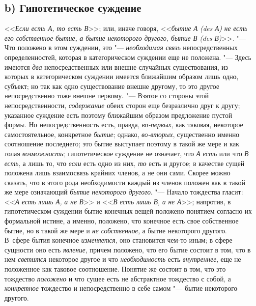 {\subsection[b) Гипотетическое суждение]{b) Гипотетическое суждение}
<<{\em Если есть А, то есть В}>>;
или, иначе говоря,
<<{\em бытие А (des А) не есть его
собственное бытие, а бытие некоторого другого, бытие В (des В)}>>. "---
Что положено в этом суждении, это
"--- {\em необходимая связь}
непосредственных определенностей, которая в категорическом
суждении еще не положена. "--- Здесь имеются
{\em два}
непосредственных или внешне-случайных существования, из
которых в категорическом суждении имеется ближайшим образом лишь одно,
субъект; но так как одно существование внешне другому, то это другое
непосредственно тоже внешне первому. "--- Взятое со стороны
этой непосредственности,
{\em содержание} обеих
сторон еще безразлично друг к другу; указанное суждение есть поэтому
ближайшим образом предложение пустой формы. Но непосредственность есть,
правда, {\em во-первых},
как таковая, некоторое самостоятельное, конкретное
{\em бытие}; однако,
{\em во-вторых},
существенно именно соотношение последнего; это бытие
выступает поэтому в такой же мере и как голая
{\em возможность};
гипотетическое суждение не означает, что
{\em А есть} или что
{\em В есть}, а лишь то,
что {\em если} есть одно
из них, {\em то} есть и
другое; в качестве сущей положена лишь взаимосвязь крайних членов, а не они
сами. Скорее можно сказать, что в этого рода необходимости каждый из членов
положен как в такой же мере означающий
{\em бытие некоторого другого}. "---
Начало тождества гласит:
<<{\em А есть лишь А, а не В}>>
и <<{\em В есть лишь В, а
не А}>>; напротив, в гипотетическом суждении бытие конечных
вещей положено понятием согласно их формальной истине, а именно, положено,
что конечное есть свое собственное бытие, но в такой же мере и
{\em не собственное}, а
бытие некоторого другого. В~сфере бытия конечное
{\em изменяется}, оно
становится чем-то иным; в сфере сущности оно есть
{\em явление}, причем
положено, что его бытие состоит в том, что в нем
{\em светится} некоторое
другое и что {\em необходимость}
есть {\em внутреннее},
еще не положенное как таковое соотношение. Понятие же состоит
в том, что это тождество {\em положено}
и что сущее есть не абстрактное тождество с собой, а
{\em конкретное}
тождество и непосредственно в себе самом
"--- бытие некоторого другого.

}
